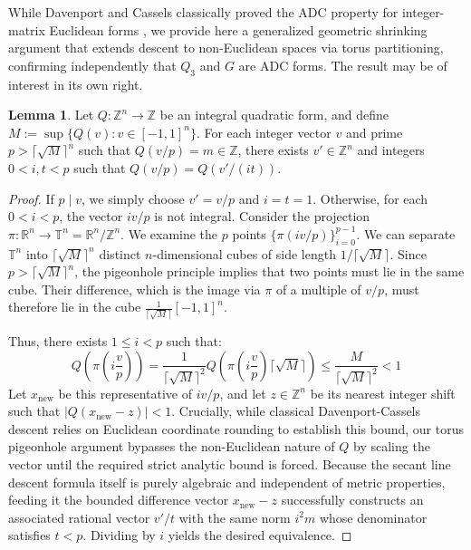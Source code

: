 \documentclass[11pt,letterpaper]{amsart} %
\theoremstyle{definition}
\newtheorem{applemma}[apptheorem]{Lemma}
\begin{document}
While Davenport and Cassels classically proved the ADC property for integer-matrix Euclidean forms \cite[Theorem 8]{Clark}, we provide here a generalized geometric shrinking argument that extends descent to non-Euclidean spaces via torus partitioning, confirming independently that $Q_3$ and $G$ are ADC forms.
The result may be of interest in its own right.

\begin{applemma}
\label{lem:torus}
Let $Q:\mathbb{Z}^n \to \mathbb{Z}$ be an integral quadratic form, and define $M := \sup\{Q(v) : v \in [-1,1]^n\}$. For each integer vector $v$ and prime $p > \lceil \sqrt{M} \rceil^n$ such that $Q(v/p) = m \in \mathbb{Z}$, there exists $v' \in \mathbb{Z}^n$ and integers $0 < i, t < p$ such that $Q(v/p) = Q(v'/(it))$.
\end{applemma}

\begin{proof}
If $p \mid v$, we simply choose $v' = v/p$ and $i=t=1$. Otherwise, for each $0 < i < p$, the vector $iv/p$ is not integral. Consider the projection $\pi: \mathbb{R}^n \to \mathbb{T}^n = \mathbb{R}^n/\mathbb{Z}^n$. We examine the $p$ points $\{\pi(iv/p)\}_{i=0}^{p-1}$. We can separate $\mathbb{T}^n$ into $\lceil\sqrt{M}\rceil^n$ distinct $n$-dimensional cubes of side length $1/\lceil\sqrt{M}\rceil$. Since $p > \lceil\sqrt{M}\rceil^n$, the pigeonhole principle implies that two points must lie in the same cube. Their difference, which is the image via $\pi$ of a multiple of $v/p$, must therefore lie in the cube $\frac{1}{\lceil\sqrt{M}\rceil}[-1,1]^n$. 

Thus, there exists $1 \le i < p$ such that:
$$Q\left(\pi\left(i\frac{v}{p}\right)\right) = \frac{1}{\lceil\sqrt{M}\rceil^2} Q\left(\pi\left(i\frac{v}{p}\right)\lceil\sqrt{M}\rceil\right) \le \frac{M}{\lceil\sqrt{M}\rceil^2} < 1$$
Let $x_{\text{new}}$ be this representative of $i v / p$, and let $z \in \mathbb{Z}^n$ be its nearest integer shift such that $|Q(x_{\text{new}} - z)| < 1$. Crucially, while classical Davenport-Cassels descent relies on Euclidean coordinate rounding to establish this bound, our torus pigeonhole argument bypasses the non-Euclidean nature of $Q$ by scaling the vector until the required strict analytic bound is forced. Because the secant line descent formula itself is purely algebraic and independent of metric properties, feeding it the bounded difference vector $x_{\text{new}} - z$ successfully constructs an associated rational vector $v'/t$ with the same norm $i^2m$ whose denominator satisfies $t < p$. Dividing by $i$ yields the desired equivalence.
\end{proof}
\end{document}
